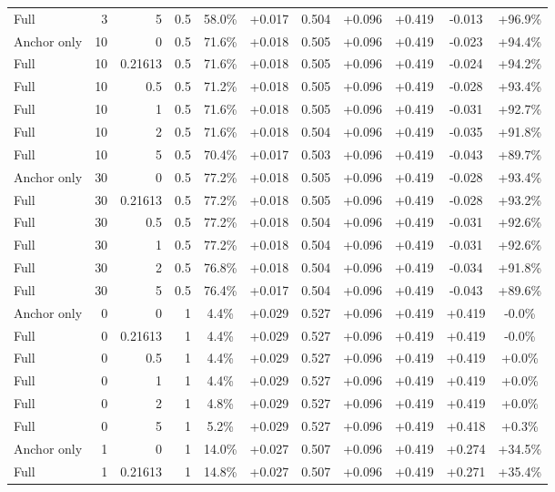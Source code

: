 \begin{table}[htbp]
\begin{tabular}{lrrrccccccc}
Full & 3 & 5 & 0.5 & 58.0\% & +0.017 & 0.504 & +0.096 & +0.419 & -0.013 & +96.9\% \\
Anchor only & 10 & 0 & 0.5 & 71.6\% & +0.018 & 0.505 & +0.096 & +0.419 & -0.023 & +94.4\% \\
Full & 10 & 0.21613 & 0.5 & 71.6\% & +0.018 & 0.505 & +0.096 & +0.419 & -0.024 & +94.2\% \\
Full & 10 & 0.5 & 0.5 & 71.2\% & +0.018 & 0.505 & +0.096 & +0.419 & -0.028 & +93.4\% \\
Full & 10 & 1 & 0.5 & 71.6\% & +0.018 & 0.505 & +0.096 & +0.419 & -0.031 & +92.7\% \\
Full & 10 & 2 & 0.5 & 71.6\% & +0.018 & 0.504 & +0.096 & +0.419 & -0.035 & +91.8\% \\
Full & 10 & 5 & 0.5 & 70.4\% & +0.017 & 0.503 & +0.096 & +0.419 & -0.043 & +89.7\% \\
Anchor only & 30 & 0 & 0.5 & 77.2\% & +0.018 & 0.505 & +0.096 & +0.419 & -0.028 & +93.4\% \\
Full & 30 & 0.21613 & 0.5 & 77.2\% & +0.018 & 0.505 & +0.096 & +0.419 & -0.028 & +93.2\% \\
Full & 30 & 0.5 & 0.5 & 77.2\% & +0.018 & 0.504 & +0.096 & +0.419 & -0.031 & +92.6\% \\
Full & 30 & 1 & 0.5 & 77.2\% & +0.018 & 0.504 & +0.096 & +0.419 & -0.031 & +92.6\% \\
Full & 30 & 2 & 0.5 & 76.8\% & +0.018 & 0.504 & +0.096 & +0.419 & -0.034 & +91.8\% \\
Full & 30 & 5 & 0.5 & 76.4\% & +0.017 & 0.504 & +0.096 & +0.419 & -0.043 & +89.6\% \\
Anchor only & 0 & 0 & 1 & 4.4\% & +0.029 & 0.527 & +0.096 & +0.419 & +0.419 & -0.0\% \\
Full & 0 & 0.21613 & 1 & 4.4\% & +0.029 & 0.527 & +0.096 & +0.419 & +0.419 & -0.0\% \\
Full & 0 & 0.5 & 1 & 4.4\% & +0.029 & 0.527 & +0.096 & +0.419 & +0.419 & +0.0\% \\
Full & 0 & 1 & 1 & 4.4\% & +0.029 & 0.527 & +0.096 & +0.419 & +0.419 & +0.0\% \\
Full & 0 & 2 & 1 & 4.8\% & +0.029 & 0.527 & +0.096 & +0.419 & +0.419 & +0.0\% \\
Full & 0 & 5 & 1 & 5.2\% & +0.029 & 0.527 & +0.096 & +0.419 & +0.418 & +0.3\% \\
Anchor only & 1 & 0 & 1 & 14.0\% & +0.027 & 0.507 & +0.096 & +0.419 & +0.274 & +34.5\% \\
Full & 1 & 0.21613 & 1 & 14.8\% & +0.027 & 0.507 & +0.096 & +0.419 & +0.271 & +35.4\% \\

\end{tabular}
\end{table}

